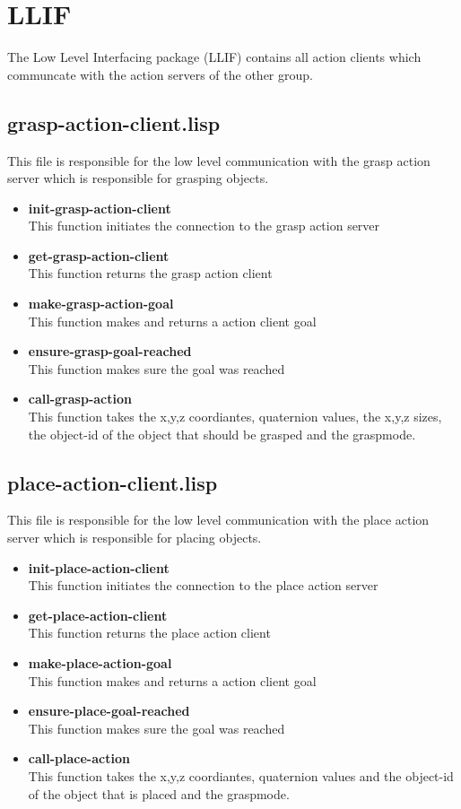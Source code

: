 \documentclass[main.tex]{subfiles}
\begin{document}
	  	\section{LLIF}
		The Low Level Interfacing package (LLIF) contains all action clients which communcate with the action servers of the other group.
		\subsection{grasp-action-client.lisp}
		This file is responsible for the low level communication with the
		grasp action server which is responsible for grasping objects.
		\begin{itemize}
			\item \textbf{init-grasp-action-client} \\
			This function initiates the connection to the grasp action server
			\item \textbf{get-grasp-action-client} \\
			This function returns the grasp action client
			\item \textbf{make-grasp-action-goal} \\
			This function makes and returns a action client goal
			\item \textbf{ensure-grasp-goal-reached} \\
            This function makes sure the goal was reached
			\item \textbf{call-grasp-action} \\
			This function takes the x,y,z coordiantes, quaternion values, the x,y,z sizes, the object-id of the object that should be grasped and the graspmode.
		\end{itemize}
		\subsection{place-action-client.lisp}
		This file is responsible for the low level communication with the
		place action server which is responsible for placing objects.
	    \begin{itemize}
			\item \textbf{init-place-action-client} \\
			This function initiates the connection to the place action server
			\item \textbf{get-place-action-client} \\
			This function returns the place action client
			\item \textbf{make-place-action-goal} \\
			This function makes and returns a action client goal
			\item \textbf{ensure-place-goal-reached} \\
            This function makes sure the goal was reached
			\item \textbf{call-place-action} \\
			This function takes the x,y,z coordiantes, quaternion values  and the object-id of the object that is placed and the graspmode.
		\end{itemize}
\end{document}
